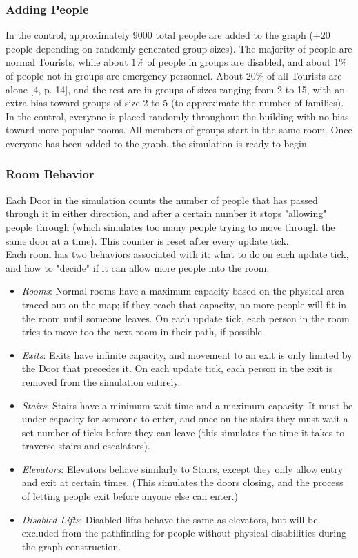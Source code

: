 \documentclass[12pt]{article}
\begin{document}
\subsubsection{Adding People}
In the control, approximately 9000 total people are added to the graph ($\pm20$ people depending on randomly generated group sizes). The majority of people are normal Tourists, while about $1\%$ of people in groups are disabled, and about $1\%$ of people not in groups are emergency personnel. About $20\%$ of all Tourists are alone [4, p. 14], and the rest are in groups of sizes ranging from 2 to 15, with an extra bias toward groups of size 2 to 5 (to approximate the number of families). In the control, everyone is placed randomly throughout the building with no bias toward more popular rooms. All members of groups start in the same room. Once everyone has been added to the graph, the simulation is ready to begin.

\subsubsection{Room Behavior}
Each Door in the simulation counts the number of people that has passed through it in either direction, and after a certain number it stops "allowing" people through (which simulates too many people trying to move through the same door at a time). This counter is reset after every update tick.\\

Each room has two behaviors associated with it: what to do on each update tick, and how to "decide" if it can allow more people into the room.
\begin{itemize}
    \item \textit{Rooms}: Normal rooms have a maximum capacity based on the physical area traced out on the map; if they reach that capacity, no more people will fit in the room until someone leaves. On each update tick, each person in the room tries to move too the next room in their path, if possible.
    \item \textit{Exits}: Exits have infinite capacity, and movement to an exit is only limited by the Door that precedes it. On each update tick, each person in the exit is removed from the simulation entirely.
    \item \textit{Stairs}: Stairs have a minimum wait time and a maximum capacity. It must be under-capacity for someone to enter, and once on the stairs they must wait a set number of ticks before they can leave (this simulates the time it takes to traverse stairs and escalators).
    \item \textit{Elevators}: Elevators behave similarly to Stairs, except they only allow entry and exit at certain times. (This simulates the doors closing, and the process of letting people exit before anyone else can enter.)
    \item \textit{Disabled Lifts}: Disabled lifts behave the same as elevators, but will be excluded from the pathfinding for people without physical disabilities during the graph construction.
\end{itemize}
\end{document}
